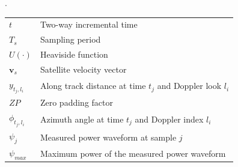 \documentclass[11pt,a4paper]{article}
\begin{document}
.
\vspace{-2cm}
\begin{table}[ht!]
\hspace{-0.2cm}\begin{tabular}{m{}m{}}


$t$ & Two-way incremental time \\

$T_s$ & Sampling period \\

$U(\cdot)$ & Heaviside function \\

$\bm{v}_s$ & Satellite velocity vector \\

$y_{t_j, l_i}$ & Along track distance at time $t_j$ and Doppler look $l_i$ \\

$ZP$ & Zero padding factor \\

$\phi_{t_j, l_i}$ & Azimuth angle at time $t_j$ and Doppler index $l_i$ \\

$\psi_j$ & Measured power waveform at sample $j$ \\

$\psi_{max}$ & Maximum power of the measured power waveform\\

\end{tabular}
\end{table}


% 
% 


% 
% 
% 
% 
\end{document}
